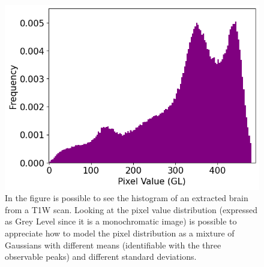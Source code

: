 \documentclass{standalone}
\begin{document}
\begin{figure}
    \centering
    \includegraphics[scale = 0.95]{img/Chap2/histogram.png}
    \caption{In the figure is possible to see the histogram of an extracted brain from a T1W scan. Looking at the pixel value distribution (expressed as Grey Level since it is a monochromatic image) is possible to appreciate how to model the pixel distribution as a mixture of Gaussians with different means (identifiable with the three observable peaks) and different standard deviations.}
    \label{fig:brain_histogram}
\end{figure}
\end{document}
